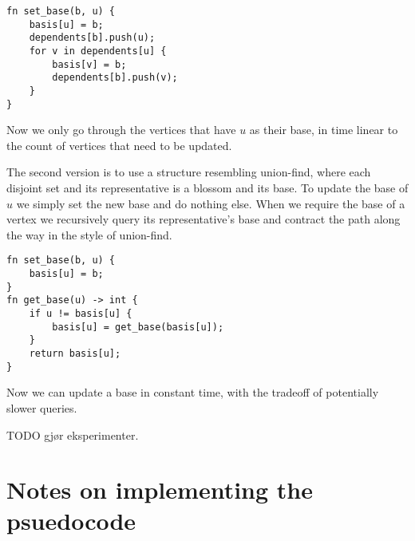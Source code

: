 \begin{lstlisting}[caption={Observer basis},label=Listing,mathescape=true]
fn set_base(b, u) {
    basis[u] = b;
    dependents[b].push(u);
    for v in dependents[u] {
        basis[v] = b;
        dependents[b].push(v);
    }
}
\end{lstlisting}

Now we only go through the vertices that have $u$ as their base, in time linear to the count of vertices that need to be updated.

The second version is to use a structure resembling union-find, where each disjoint set and its representative is a blossom and its base. To update the base of $u$ we simply set the new base and do nothing else. When we require the base of a vertex we recursively query its representative's base and contract the path along the way in the style of union-find. 

\begin{lstlisting}[caption={UF-like basis},label=Listing,mathescape=true]
fn set_base(b, u) {
    basis[u] = b;
}
fn get_base(u) -> int {
    if u != basis[u] {
        basis[u] = get_base(basis[u]);
    }
    return basis[u];
}

\end{lstlisting}

Now we can update a base in constant time, with the tradeoff of potentially slower queries.

TODO gjør eksperimenter.

\section{Notes on implementing the psuedocode}